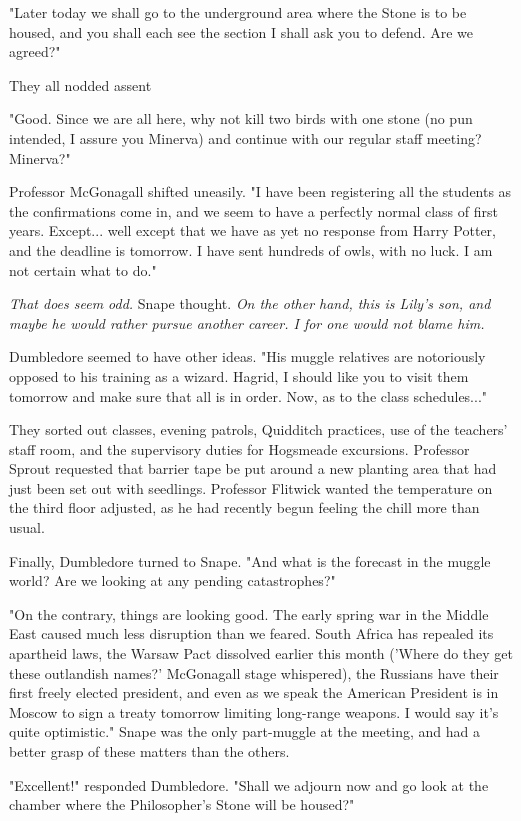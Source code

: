 "Later today we shall go to the underground area where the Stone is to be housed, and you shall each see the section I shall ask you to defend. Are we agreed?"

They all nodded assent

"Good. Since we are all here, why not kill two birds with one stone (no pun intended, I assure you Minerva) and continue with our regular staff meeting? Minerva?"

Professor McGonagall shifted uneasily. "I have been registering all the students as the confirmations come in, and we seem to have a perfectly normal class of first years. Except... well except that we have as yet no response from Harry Potter, and the deadline is tomorrow. I have sent hundreds of owls, with no luck. I am not certain what to do."

\emph{That does seem odd.} Snape thought. \emph{On the other hand, this is Lily's son, and maybe he would rather pursue another career. I for one would not blame him.}

Dumbledore seemed to have other ideas. "His muggle relatives are notoriously opposed to his training as a wizard. Hagrid, I should like you to visit them tomorrow and make sure that all is in order. Now, as to the class schedules..."

They sorted out classes, evening patrols, Quidditch practices, use of the teachers' staff room, and the supervisory duties for Hogsmeade excursions. Professor Sprout requested that barrier tape be put around a new planting area that had just been set out with seedlings. Professor Flitwick wanted the temperature on the third floor adjusted, as he had recently begun feeling the chill more than usual.

Finally, Dumbledore turned to Snape. "And what is the forecast in the muggle world? Are we looking at any pending catastrophes?"

"On the contrary, things are looking good. The early spring war in the Middle East caused much less disruption than we feared. South Africa has repealed its apartheid laws, the Warsaw Pact dissolved earlier this month ('Where do they get these outlandish names?' McGonagall stage whispered), the Russians have their first freely elected president, and even as we speak the American President is in Moscow to sign a treaty tomorrow limiting long-range weapons. I would say it's quite optimistic." Snape was the only part-muggle at the meeting, and had a better grasp of these matters than the others.

"Excellent!" responded Dumbledore. "Shall we adjourn now and go look at the chamber where the Philosopher's Stone will be housed?"

